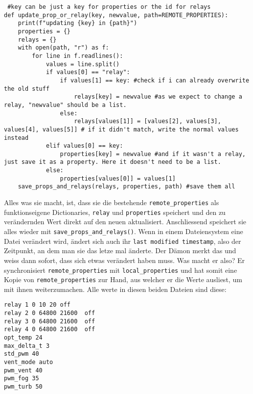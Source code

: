 \documentclass[12pt,titlepage,a4paper]{article}
\begin{document}
 \begin{verbatim}
 #key can be just a key for properties or the id for relays
def update_prop_or_relay(key, newvalue, path=REMOTE_PROPERTIES):
	print(f"updating {key} in {path}")
	properties = {}
	relays = {}
	with open(path, "r") as f:
		for line in f.readlines():
			values = line.split()
			if values[0] == "relay":
				if values[1] == key: #check if i can already overwrite the old stuff
					relays[key] = newvalue #as we expect to change a relay, "newvalue" should be a list.
				else:
					relays[values[1]] = [values[2], values[3], values[4], values[5]] # if it didn't match, write the normal values instead 
			elif values[0] == key:
				properties[key] = newvalue #and if it wasn't a relay, just save it as a property. Here it doesn't need to be a list.
			else:
				properties[values[0]] = values[1]
	save_props_and_relays(relays, properties, path)	#save them all
 \end{verbatim}
Alles was sie macht, ist, dass sie die bestehende \verb^remote_properties^ als funktionseigene Dictionaries, \verb^relay^ und \verb^properties^ speichert und den zu verändernden Wert direkt auf den neuen aktualisiert. Anschliessend speichert sie alles wieder mit  \verb^save_props_and_relays()^. Wenn in einem Dateiensystem eine Datei verändert wird, ändert sich auch ihr \verb^last modified timestamp^, also der Zeitpunkt, an dem man sie das letze mal änderte. Der Dämon merkt das und weiss dann sofort, dass sich etwas verändert haben muss. Was macht er also? Er synchronisiert \verb^remote_properties^ mit \verb^local_properties^ und hat somit eine Kopie von \verb^remote_properties^ zur Hand, aus welcher er die Werte ausliest, um mit ihnen weiterzumachen. Alle werte in diesen beiden Dateien sind diese:
\begin{verbatim}
relay 1 0 10 20 off
relay 2 0 64800 21600  off
relay 3 0 64800 21600  off
relay 4 0 64800 21600  off
opt_temp 24
max_delta_t 3
std_pwm 40
vent_mode auto
pwm_vent 40
pwm_fog 35
pwm_turb 50
\end{verbatim}
\end{document}
